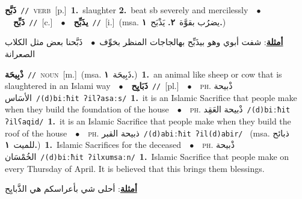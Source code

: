 \documentclass[10pt,a4paper,twoside]{article} %
\begin{document}
\begin{multicols}{2}
{\setlength\topsep{0pt}\textbf{\foreignlanguage{arabic}{ذَبَّح}}\ {\color{gray}\texttt{//}\color{black}}\ \textsc{verb}\ [p.]\ \textbf{1.}~slaughter  \textbf{2.}~beat sb severely and mercilessly\ \ $\bullet$\ \ \setlength\topsep{0pt}\textbf{\foreignlanguage{arabic}{ذَبِّح}}\ {\color{gray}\texttt{//}\color{black}}\ [c.]\ \ $\bullet$\ \ \setlength\topsep{0pt}\textbf{\foreignlanguage{arabic}{يذَبِّح}}\ {\color{gray}\texttt{//}\color{black}}\ [i.]\ \color{gray}(msa. \foreignlanguage{arabic}{يضرُب بقوَّة}~\foreignlanguage{arabic}{\textbf{٢.}}  \foreignlanguage{arabic}{يَذْبَح}~\foreignlanguage{arabic}{\textbf{١.}})\color{black}\  \begin{flushright}\color{gray}\foreignlanguage{arabic}{\textbf{\underline{\foreignlanguage{arabic}{أمثلة}}}: شفت أبوي وهو بيذَبِّح بهالجاجات المنظر بخوِّف\ $\bullet$\ \  ذَبَّحنا بعض مثل الكلاب الصعرانة}\end{flushright}\color{black}} \vspace{2mm}

{\setlength\topsep{0pt}\textbf{\foreignlanguage{arabic}{ذْبِيحَة}}\ {\color{gray}\texttt{//}\color{black}}\ \textsc{noun}\ [m.]\ \color{gray}(msa. \foreignlanguage{arabic}{ذَبِيحَة}~\foreignlanguage{arabic}{\textbf{١.}})\color{black}\ \textbf{1.}~an animal like sheep or cow that is slaughtered in an Islami way\ \ $\bullet$\ \ \setlength\topsep{0pt}\textbf{\foreignlanguage{arabic}{ذَبَايِح}}\ {\color{gray}\texttt{//}\color{black}}\ [pl.]\ \ $\bullet$\ \ \textsc{ph.} \color{gray} \foreignlanguage{arabic}{ذْبيحة الأسَاس}\color{black}\ {\color{gray}\texttt{/{\sffamily (d)biːħit ʔilʔasaːs}/}\color{black}}\ \textbf{1.}~it is an Islamic Sacrifice that people make when they build the foundation of the house\ \ $\bullet$\ \ \textsc{ph.} \color{gray} \foreignlanguage{arabic}{ذْبيحة العَقِد}\color{black}\ {\color{gray}\texttt{/{\sffamily (d)biːħit ʔilʕaqid}/}\color{black}}\ \textbf{1.}~it is an Islamic Sacrifice that people make when they build the roof of the house\ \ $\bullet$\ \ \textsc{ph.} \color{gray} \foreignlanguage{arabic}{ذبيحة القبر}\color{black}\ {\color{gray}\texttt{/{\sffamily (d)abiːħit ʔil(d)abir}/}\color{black}}\ \color{gray} (msa. \foreignlanguage{arabic}{ذبائح للميت}~\foreignlanguage{arabic}{\textbf{١.}})\color{black}\ \textbf{1.}~Islamic Sacrifices for the deceased\ \ $\bullet$\ \ \textsc{ph.} \color{gray} \foreignlanguage{arabic}{ذْبيحة الخُمْسَان}\color{black}\ {\color{gray}\texttt{/{\sffamily (d)biːħit ʔilxumsaːn}/}\color{black}}\ \textbf{1.}~Islamic Sacrifice that people make on every Thursday of April. It is believed that this brings them blessings.\  \begin{flushright}\color{gray}\foreignlanguage{arabic}{\textbf{\underline{\foreignlanguage{arabic}{أمثلة}}}: أحلى شي بأعراسكم هي الذَّبايِح}\end{flushright}\color{black}} \vspace{2mm}


\end{multicols}
\end{document}
